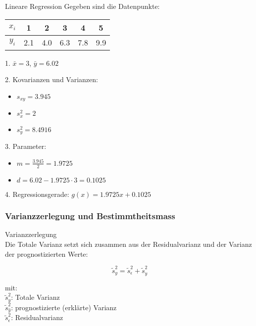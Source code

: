 \begin{example2}{Lineare Regression}
Gegeben sind die Datenpunkte:
\begin{center}
\begin{tabular}{|c|c|c|c|c|c|}
\hline
$x_i$ & 1 & 2 & 3 & 4 & 5 \\
\hline
$y_i$ & 2.1 & 4.0 & 6.3 & 7.8 & 9.9 \\
\hline
\end{tabular}
\end{center}

1. $\bar{x} = 3$, $\bar{y} = 6.02$

2. Kovarianzen und Varianzen:
   \begin{itemize}
     \item $s_{xy} = 3.945$
     \item $s_x^2 = 2$
     \item $s_y^2 = 8.4916$
   \end{itemize}

3. Parameter:
   \begin{itemize}
     \item $m = \frac{3.945}{2} = 1.9725$
     \item $d = 6.02 - 1.9725 \cdot 3 = 0.1025$
   \end{itemize}

4. Regressionsgerade: $g(x) = 1.9725x + 0.1025$
\end{example2}

\subsubsection{Varianzzerlegung und Bestimmtheitsmass}

\begin{concept}{Varianzzerlegung}\\
Die Totale Varianz setzt sich zusammen aus der Residualvarianz und der Varianz der prognostizierten Werte:

$$\tilde{s}_y^2 = \tilde{s}_\epsilon^2 + \tilde{s}_{\hat{y}}^2$$

mit:\\
$\tilde{s}_y^2$: Totale Varianz\\
$\tilde{s}_{\hat{y}}^2$: prognostizierte (erklärte) Varianz\\
$\tilde{s}_\epsilon^2$: Residualvarianz
\end{concept}


